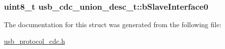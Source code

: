 \label{structusb__cdc__union__desc__t_af4e4d675b8761d7add9bf4137b94b111}
\hypertarget{structusb__cdc__union__desc__t_af5d1cb7921388e8c381082db723e693d}{
\subsubsection[{b\-Slave\-Interface0}]{\setlength{\rightskip}{0pt plus 5cm}uint8\-\_\-t {\bf usb\-\_\-cdc\-\_\-union\-\_\-desc\-\_\-t\-::b\-Slave\-Interface0}}}
\label{structusb__cdc__union__desc__t_af5d1cb7921388e8c381082db723e693d}


\-The documentation for this struct was generated from the following file\-:\begin{DoxyCompactItemize}
\item 
\hyperlink{usb__protocol__cdc_8h}{usb\-\_\-protocol\-\_\-cdc.\-h}\end{DoxyCompactItemize}
